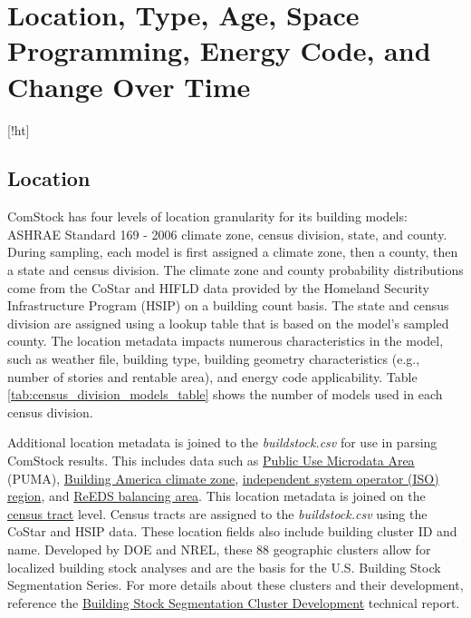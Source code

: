 \section{Location, Type, Age, Space Programming, Energy Code, and Change Over Time}[!ht]
\subsection{Location}

ComStock has four levels of location granularity for its building models: ASHRAE Standard 169 - 2006 climate zone, census division, state, and county. During sampling, each model is first assigned a climate zone, then a county, then a state and census division. The climate zone and county probability distributions come from the CoStar and HIFLD data provided by the Homeland Security Infrastructure Program (HSIP) on a building count basis. The state and census division are assigned using a lookup table that is based on the model's sampled county. The location metadata impacts numerous characteristics in the model, such as weather file, building type, building geometry characteristics (e.g., number of stories and rentable area), and energy code applicability. Table  \ref{tab:census_division_models_table} shows the number of models used in each census division.

Additional location metadata is joined to the \emph{buildstock.csv} for use in parsing ComStock results. This includes data such as \href{https://www.census.gov/programs-surveys/geography/guidance/geo-areas/pumas.html}{Public Use Microdata Area} (PUMA), \href{https://www.energy.gov/eere/buildings/building-america-climate-specific-guidance}{Building America climate zone}, \href{https://isorto.org/}{independent system operator (ISO) region}, and \href{https://www.nrel.gov/analysis/reeds}{ReEDS balancing area}. This location metadata is joined on the \href{https://www2.census.gov/geo/pdfs/education/CensusTracts.pdf}{census tract} level. Census tracts are assigned to the \emph{buildstock.csv} using the CoStar and HSIP data. These location fields also include building cluster ID and name. Developed by DOE and NREL, these 88 geographic clusters allow for localized building stock analyses and are the basis for the U.S. Building Stock Segmentation Series. For more details about these clusters and their development, reference the \href{https://www.nrel.gov/docs/fy23osti/84648.pdf}{Building Stock Segmentation Cluster Development} technical report.



